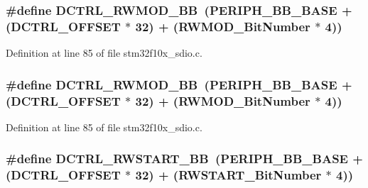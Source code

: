 \subsubsection[{\texorpdfstring{D\+C\+T\+R\+L\+\_\+\+R\+W\+M\+O\+D\+\_\+\+BB}{DCTRL_RWMOD_BB}}]{\setlength{\rightskip}{0pt plus 5cm}\#define D\+C\+T\+R\+L\+\_\+\+R\+W\+M\+O\+D\+\_\+\+BB~({\bf P\+E\+R\+I\+P\+H\+\_\+\+B\+B\+\_\+\+B\+A\+SE} + ({\bf D\+C\+T\+R\+L\+\_\+\+O\+F\+F\+S\+ET} $\ast$ 32) + ({\bf R\+W\+M\+O\+D\+\_\+\+Bit\+Number} $\ast$ 4))}\hypertarget{group___s_d_i_o___private___types_definitions_gad34bfe8650534ce24320ae83886c91e3}{}\label{group___s_d_i_o___private___types_definitions_gad34bfe8650534ce24320ae83886c91e3}


Definition at line 85 of file stm32f10x\+\_\+sdio.\+c.

\subsubsection[{\texorpdfstring{D\+C\+T\+R\+L\+\_\+\+R\+W\+M\+O\+D\+\_\+\+BB}{DCTRL_RWMOD_BB}}]{\setlength{\rightskip}{0pt plus 5cm}\#define D\+C\+T\+R\+L\+\_\+\+R\+W\+M\+O\+D\+\_\+\+BB~({\bf P\+E\+R\+I\+P\+H\+\_\+\+B\+B\+\_\+\+B\+A\+SE} + ({\bf D\+C\+T\+R\+L\+\_\+\+O\+F\+F\+S\+ET} $\ast$ 32) + ({\bf R\+W\+M\+O\+D\+\_\+\+Bit\+Number} $\ast$ 4))}\hypertarget{group___s_d_i_o___private___types_definitions_gad34bfe8650534ce24320ae83886c91e3}{}\label{group___s_d_i_o___private___types_definitions_gad34bfe8650534ce24320ae83886c91e3}


Definition at line 85 of file stm32f10x\+\_\+sdio.\+c.

\subsubsection[{\texorpdfstring{D\+C\+T\+R\+L\+\_\+\+R\+W\+S\+T\+A\+R\+T\+\_\+\+BB}{DCTRL_RWSTART_BB}}]{\setlength{\rightskip}{0pt plus 5cm}\#define D\+C\+T\+R\+L\+\_\+\+R\+W\+S\+T\+A\+R\+T\+\_\+\+BB~({\bf P\+E\+R\+I\+P\+H\+\_\+\+B\+B\+\_\+\+B\+A\+SE} + ({\bf D\+C\+T\+R\+L\+\_\+\+O\+F\+F\+S\+ET} $\ast$ 32) + ({\bf R\+W\+S\+T\+A\+R\+T\+\_\+\+Bit\+Number} $\ast$ 4))}\hypertarget{group___s_d_i_o___private___types_definitions_gac776c39dfac0e1ed007217133e1145c3}{}\label{group___s_d_i_o___private___types_definitions_gac776c39dfac0e1ed007217133e1145c3}


